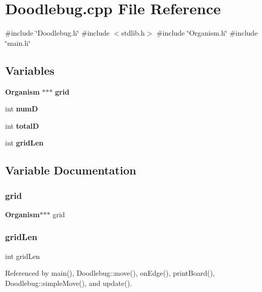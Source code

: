 \section{Doodlebug.\+cpp File Reference}
\label{Doodlebug_8cpp}
{\ttfamily \#include \char`\"{}Doodlebug.\+h\char`\"{}}\newline
{\ttfamily \#include $<$stdlib.\+h$>$}\newline
{\ttfamily \#include \char`\"{}Organism.\+h\char`\"{}}\newline
{\ttfamily \#include \char`\"{}main.\+h\char`\"{}}\newline
\subsection*{Variables}
\begin{DoxyCompactItemize}
\item 
\textbf{ Organism} $\ast$$\ast$$\ast$ \textbf{ grid}
\item 
int \textbf{ numD}
\item 
int \textbf{ totalD}
\item 
int \textbf{ grid\+Len}
\end{DoxyCompactItemize}


\subsection{Variable Documentation}
\mbox{\label{Doodlebug_8cpp_aa32ee8a4e56a98f78518c23b635e5f69}} 
\subsubsection{grid}
{\footnotesize\ttfamily \textbf{ Organism}$\ast$$\ast$$\ast$ grid}

\mbox{\label{Doodlebug_8cpp_a832020065060cfffc4a937e7b009b347}} 
\subsubsection{grid\+Len}
{\footnotesize\ttfamily int grid\+Len}



Referenced by main(), Doodlebug\+::move(), on\+Edge(), print\+Board(), Doodlebug\+::simple\+Move(), and update().

